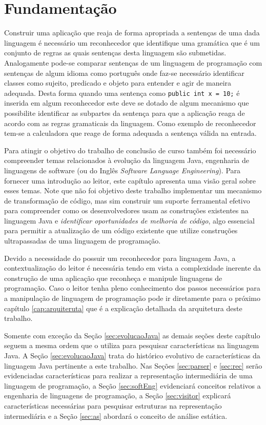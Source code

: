 \chapter{Fundamentação}
Construir uma aplicação que reaja de forma apropriada a sentenças de uma dada linguagem é necessário um reconhecedor que identifique uma gramática que é um conjunto de regras as quais sentenças desta linguagem são submetidas. Analogamente pode-se comparar sentenças de um linguagem de programação com sentenças de algum idioma como português onde faz-se necessário identificar classes como sujeito, predicado e objeto para entender e agir de maneira adequada. Desta forma quando uma sentença como \texttt{public int x = 10;} é inserida em algum reconhecedor este deve se dotado de algum mecanismo que possibilite identificar as subpartes da sentença para que a aplicação reaga de acordo com as regras gramaticais da linguagem. Como exemplo de reconhecedor tem-se a calculadora que reage de forma adequada a sentença válida na entrada.

Para atingir o objetivo do trabalho de conclusão de curso também foi necessário compreender temas relacionados à evolução da linguagem Java, engenharia de linguagens de software (ou do Inglês \emph{Software Language Engineering}). Para fornecer uma introdução ao leitor, este capítulo apresenta uma visão geral sobre esses temas. Note que não foi objetivo deste trabalho implementar um mecanismo de transformação de código, mas sim construir um suporte ferramental efetivo para compreender como os desenvolvedores usam as construções existentes na linguagem Java e \emph{identificar oportunidades de melhoria de código}, algo essencial para permitir a atualização de um código existente que utilize construções ultrapassadas de uma linguagem de programação.

Devido a necessidade do \NOMESOFTWARE possuir um reconhecedor para linguagem Java, a contextualização do leitor é necessária tendo em vista a complexidade inerente da construção de uma aplicação que reconheça e manipule linguagens de programação. Caso o leitor tenha pleno conhecimento dos passos necessários para a manipulação de linguagem de programação pode ir diretamente para o próximo capítulo \ref{cap:arquiteruta} que é a explicação detalhada da arquitetura deste trabalho. 

Somente com exceção da Seção \ref{sec:evolucaoJava} as demais seções deste capítulo seguem a mesma ordem que o \NOMESOFTWARE  utiliza para pesquisar características na linguagem Java. A Seção \ref{sec:evolucaoJava} trata do histórico evolutivo de características da linguagem Java pertinente a este trabalho. Nas Seções \ref{sec:parser} e \ref{sec:rec} serão evidenciadas características para realizar a representação intermediária de uma linguagem de programação, a Seção \ref{sec:softEng} evidenciará conceitos relativos a engenharia de linguagens de programação,  a Seção \ref{sec:visitor} explicará características necessárias para pesquisar estruturas na representação intermediária e a Seção \ref{sec:as} abordará o conceito de análise estática.

